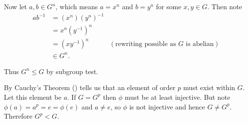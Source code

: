 \begin{questions}
\begin{partquestions}{\roman*}
        Now let $a, b \in G^n$, which means $a = x^n$ and $b = y^n$ for some $x, y \in G$. Then note
        \begin{align*}
            ab^{-1} &= (x^n)(y^n)^{-1}\\
            &= x^n(y^{-1})^n\\
            &= (xy^{-1})^n & (\text{rewriting possible as }G \text{ is abelian})\\
            &\in G^n.
        \end{align*}

        Thus $G^n \leq G$ by subgroup test.

        \item By Cauchy's Theorem () tells us that an element of order $p$ must exist within $G$. Let this element be $a$. If $G = G^p$ then $\phi$ must be at least injective. But note $\phi(a) = a^p = e = \phi(e)$ and $a \neq e$, so $\phi$ is not injective and hence $G \neq G^p$. Therefore $G^p < G$.
    \end{partquestions}
\end{questions}

